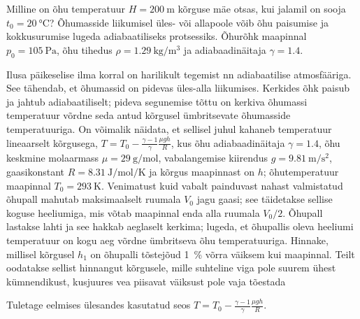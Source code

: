 \documentclass[a4paper,11pt,twocolumn]{article}
\begin{document}
\begin{question}
	Milline on õhu temperatuur \(  H = \SI{200}{\m} \) kõrguse mäe otsas, kui jalamil on sooja \( t_0 = \SI{20}{\degreeCelsius} \)? Õhumasside liikumisel üles- või allapoole võib õhu paisumise ja kokkusurumise lugeda adiabaatiliseks protsessiks. Õhurõhk maapinnal \( p_0 = \SI{105}{\pascal} \), õhu tihedus \( \rho = \SI{1,29}{\kg\per\m\cubed} \) ja adiabaadinäitaja \( \gamma = \num{1,4} \).
\end{question}
\begin{question}[Lõppv 2018, G8]
	Ilusa päikeselise ilma korral on harilikult tegemist nn adiabaatilise atmosfääriga. See tähendab, et õhumassid on pidevas üles-alla liikumises. Kerkides õhk paisub ja jahtub adiabaatiliselt; pideva segunemise tõttu on kerkiva õhumassi temperatuur võrdne seda antud kõrgusel ümbritsevate õhumasside temperatuuriga. On võimalik näidata, et sellisel juhul kahaneb temperatuur lineaarselt kõrgusega, \( T=T_0-\frac{\gamma-1}{\gamma}\frac{\mu g h}{R} \), kus õhu adiabaadinäitaja \( \gamma = \num{1,4} \), õhu keskmine molaarmass \( \mu = \SI{29}{\g\per\mol} \), vabalangemise kiirendus \( g = \SI{9,81}{\m\per\s\squared}  \), gaasikonstant \( R = \SI{8,31}{\J\per\mol\per\K}\) ja kõrgus maapinnast on \( h \); õhutemperatuur maapinnal \( T_0 = \SI{293}{\K} \). Venimatust kuid vabalt painduvast nahast valmistatud õhupall mahutab maksimaalselt ruumala \( V_0 \) jagu gaasi; see täidetakse sellise koguse heeliumiga, mis võtab maapinnal enda alla ruumala \( V_0/2 \). Õhupall lastakse lahti ja see hakkab aeglaselt kerkima; lugeda, et õhupallis oleva heeliumi temperatuur on kogu aeg võrdne ümbritseva õhu temperatuuriga. Hinnake, millisel kõrgusel \( h_1 \) on õhupalli tõstejõud \SI{1}{\percent} võrra väiksem kui maapinnal. Teilt oodatakse sellist hinnangut kõrgusele, mille suhteline viga pole suurem ühest kümnendikust, kusjuures vea piisavat väiksust pole vaja tõestada
\end{question}
\begin{question}
	Tuletage eelmises ülesandes kasutatud seos \( T=T_0-\frac{\gamma-1}{\gamma}\frac{\mu g h}{R} \).
\end{question}
\end{document}
